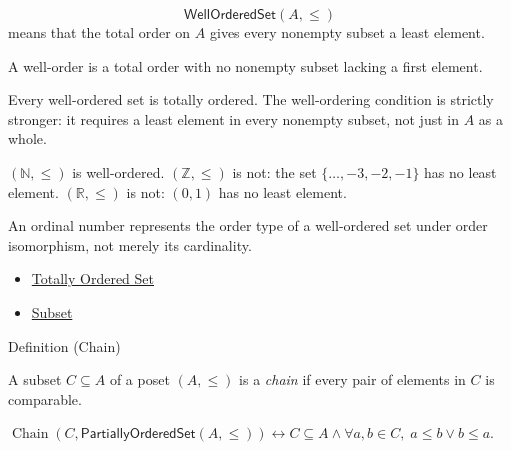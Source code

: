 \begin{remark*}
\[
  \mathsf{WellOrderedSet}(A,\leq)
\] means that the total order on $A$ gives every
nonempty subset a least element.
\end{remark*}

\begin{remark*}[Interpretation]
A well-order is a total order with no nonempty subset lacking a first element.
\end{remark*}

\begin{remark*}[Exposition]
Every well-ordered set is totally ordered. The well-ordering condition is
strictly stronger: it requires a least element in every nonempty subset,
not just in $A$ as a whole.
\end{remark*}

\begin{remark*}[Exposition]
$(\mathbb{N},\leq)$ is well-ordered. $(\mathbb{Z},\leq)$ is not: the set
$\{\dots,-3,-2,-1\}$ has no least element. $(\mathbb{R},\leq)$ is not:
$(0,1)$ has no least element.
\end{remark*}

\begin{remark*}[Exposition]
An ordinal number represents the order type of a well-ordered set under order
isomorphism, not merely its cardinality.
\end{remark*}

\begin{dependencies}
\begin{itemize}
  \item \hyperref[def:totally-ordered-set]{Totally Ordered Set}
  \item \hyperref[def:subset]{Subset}
\end{itemize}
\end{dependencies}

\begin{definitionbox}{Definition (Chain)}
\begin{definition}[Chain]\label{def:order-chain}
A subset $C \subseteq A$ of a poset $(A,\leq)$ is a \emph{chain} if every
pair of elements in $C$ is comparable.
\end{definition}
\end{definitionbox}

\begin{remark*}
$\operatorname{Chain}(C,\mathsf{PartiallyOrderedSet}(A,\leq))
\leftrightarrow C\subseteq A\wedge
\forall a,b\in C,\; a\leq b\vee b\leq a$.
\end{remark*}

